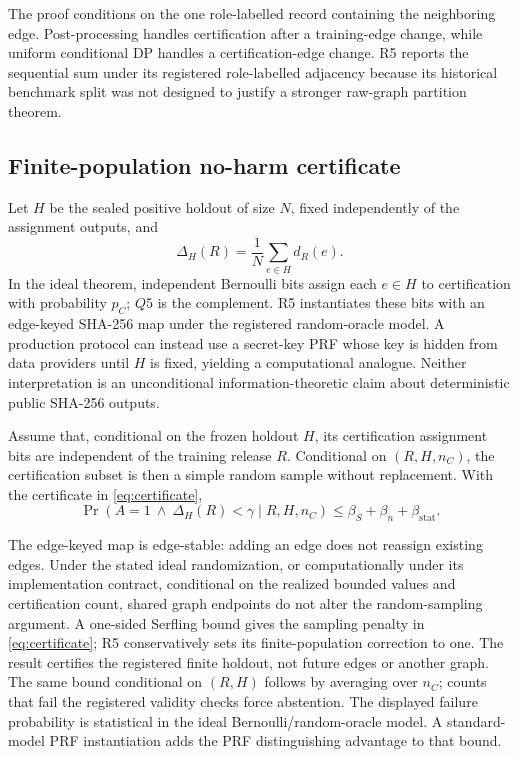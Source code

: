 The proof conditions on the one role-labelled record containing the
neighboring edge.
Post-processing handles certification after a training-edge change, while
uniform conditional DP handles a certification-edge change. R5 reports the
sequential sum under its registered role-labelled adjacency because its
historical benchmark split was not designed to justify a stronger raw-graph
partition theorem.

\subsection{Finite-population no-harm certificate}

Let $H$ be the sealed positive holdout of size $N$, fixed independently of the
assignment outputs, and
\begin{equation}
 \Delta_H(R)=\frac{1}{N}\sum_{e\in H}d_R(e).
\end{equation}
In the ideal theorem, independent Bernoulli bits assign each $e\in H$ to
certification with probability $p_C$; $Q5$ is the complement. R5 instantiates
these bits with an edge-keyed SHA-256 map under the registered random-oracle
model. A production protocol can instead use a secret-key PRF whose key is
hidden from data providers until $H$ is fixed, yielding a computational
analogue. Neither interpretation is an unconditional information-theoretic
claim about deterministic public SHA-256 outputs.

\begin{theorem}
\label{thm:noharm}
Assume that, conditional on the frozen holdout $H$, its certification
assignment bits are independent of the training release $R$. Conditional on
$(R,H,n_C)$, the certification subset is then a simple random sample without
replacement. With the certificate in \cref{eq:certificate},
\begin{equation}
\Pr\!\left(A=1\ \wedge\ \Delta_H(R)<\gamma
           \mid R,H,n_C\right)
\leq \beta_S+\beta_n+\beta_{\mathrm{stat}}.
\end{equation}
\end{theorem}

The edge-keyed map is edge-stable: adding an edge does not reassign existing
edges. Under the stated ideal randomization, or computationally under its
implementation contract, conditional on the realized bounded values and
certification count, shared graph endpoints do not alter the random-sampling
argument. A one-sided Serfling bound
\cite{serfling1974probability} gives the
sampling penalty in \cref{eq:certificate}; R5 conservatively sets its
finite-population correction to one. The result certifies the registered
finite holdout, not future edges or another graph.
The same bound conditional on $(R,H)$ follows by averaging over $n_C$;
counts that fail the registered validity checks force abstention.
The displayed failure probability is statistical in the ideal
Bernoulli/random-oracle model. A standard-model PRF instantiation adds the
PRF distinguishing advantage to that bound.

